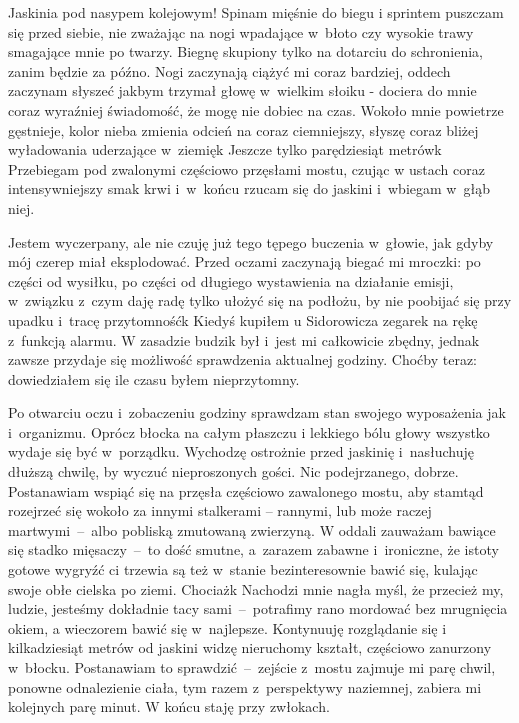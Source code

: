 \documentclass[../MAIN.tex]{subfiles}
\begin{document}
Jaskinia pod nasypem kolejowym! Spinam mięśnie do biegu i
sprintem puszczam się przed siebie, nie zważając na nogi
wpadające w~błoto czy wysokie trawy smagające mnie po twarzy.
Biegnę skupiony tylko na dotarciu do schronienia, zanim będzie
za późno. Nogi zaczynają ciążyć mi coraz bardziej, oddech
zaczynam słyszeć jakbym trzymał głowę w~wielkim słoiku -
dociera do mnie coraz wyraźniej świadomość, że mogę nie dobiec
na czas. Wokoło mnie powietrze gęstnieje, kolor nieba zmienia
odcień na coraz ciemniejszy, słyszę coraz bliżej wyładowania
uderzające w~ziemię\3k Jeszcze tylko parędziesiąt metrów\3k
Przebiegam pod zwalonymi częściowo przęsłami mostu, czując w
ustach coraz intensywniejszy smak krwi i~w~końcu rzucam się do
jaskini i~wbiegam w~głąb niej.

Jestem wyczerpany, ale nie czuję
już tego tępego buczenia w~głowie, jak gdyby mój czerep miał
eksplodować. Przed oczami zaczynają biegać mi mroczki: po
części od wysiłku, po części od długiego wystawienia na
działanie emisji, w~związku z~czym daję radę tylko ułożyć się
na podłożu, by nie poobijać się przy upadku i~tracę
przytomność\3k
%
%
Kiedyś kupiłem u Sidorowicza zegarek na rękę z~funkcją alarmu.
W zasadzie budzik był i~jest mi całkowicie zbędny, jednak
zawsze przydaje się możliwość sprawdzenia aktualnej godziny.
Choćby teraz: dowiedziałem się ile czasu byłem nieprzytomny.

Po otwarciu oczu i~zobaczeniu godziny sprawdzam stan swojego
wyposażenia jak i~organizmu. Oprócz błocka na całym płaszczu i
lekkiego bólu głowy wszystko wydaje się być w~porządku.
Wychodzę ostrożnie przed jaskinię i~nasłuchuję dłuższą chwilę,
by wyczuć nieproszonych gości. Nic podejrzanego, dobrze.
Postanawiam wspiąć się na przęsła częściowo zawalonego mostu,
aby stamtąd rozejrzeć się wokoło za innymi stalkerami –
rannymi, lub może raczej martwymi~--~albo pobliską zmutowaną
zwierzyną. W oddali zauważam bawiące się stadko mięsaczy~--~to
dość smutne, a~zarazem zabawne i~ironiczne, że istoty gotowe
wygryźć ci trzewia są też w~stanie bezinteresownie bawić się,
kulając swoje obłe cielska po ziemi.
Chociaż\3k
Nachodzi mnie
nagła myśl, że przecież my, ludzie, jesteśmy dokładnie tacy
sami~--~potrafimy rano mordować bez mrugnięcia okiem, a
wieczorem bawić się w~najlepsze. Kontynuuję rozglądanie się i
kilkadziesiąt metrów od jaskini widzę nieruchomy kształt,
częściowo zanurzony w~błocku. Postanawiam to
sprawdzić~--~zejście z~mostu zajmuje mi parę chwil, ponowne
odnalezienie
ciała, tym razem z~perspektywy naziemnej, zabiera mi kolejnych
parę minut. W końcu staję przy zwłokach.
\end{document}
